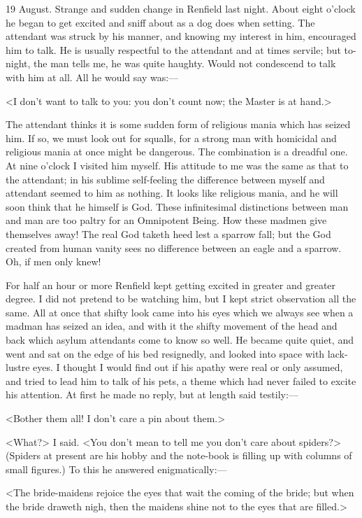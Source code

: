 \begin{diary}{19 August.}
Strange and sudden change in Renfield last night. About eight o'clock he began to get excited and sniff about as a dog does when setting. The attendant was struck by his manner, and knowing my interest in him, encouraged him to talk. He is usually respectful to the attendant and at times servile; but to-night, the man tells me, he was quite haughty. Would not condescend to talk with him at all. All he would say was:—

<I don't want to talk to you: you don't count now; the Master is at hand.>

The attendant thinks it is some sudden form of religious mania which has seized him. If so, we must look out for squalls, for a strong man with homicidal and religious mania at once might be dangerous. The combination is a dreadful one. At nine o'clock I visited him myself. His attitude to me was the same as that to the attendant; in his sublime self-feeling the difference between myself and attendant seemed to him as nothing. It looks like religious mania, and he will soon think that he himself is God. These infinitesimal distinctions between man and man are too paltry for an Omnipotent Being. How these madmen give themselves away! The real God taketh heed lest a sparrow fall; but the God created from human vanity sees no difference between an eagle and a sparrow. Oh, if men only knew!

For half an hour or more Renfield kept getting excited in greater and greater degree. I did not pretend to be watching him, but I kept strict observation all the same. All at once that shifty look came into his eyes which we always see when a madman has seized an idea, and with it the shifty movement of the head and back which asylum attendants come to know so well. He became quite quiet, and went and sat on the edge of his bed resignedly, and looked into space with lack-lustre eyes. I thought I would find out if his apathy were real or only assumed, and tried to lead him to talk of his pets, a theme which had never failed to excite his attention. At first he made no reply, but at length said testily:—

<Bother them all! I don't care a pin about them.>

<What?> I said. <You don't mean to tell me you don't care about spiders?> (Spiders at present are his hobby and the note-book is filling up with columns of small figures.) To this he answered enigmatically:—

<The bride-maidens rejoice the eyes that wait the coming of the bride; but when the bride draweth nigh, then the maidens shine not to the eyes that are filled.>


\end{diary}
